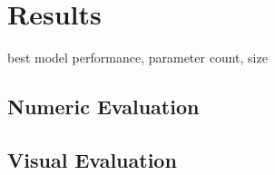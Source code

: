 \section{Results}

best model performance, parameter count, size

\subsection{Numeric Evaluation}

\subsection{Visual Evaluation}


\newpage